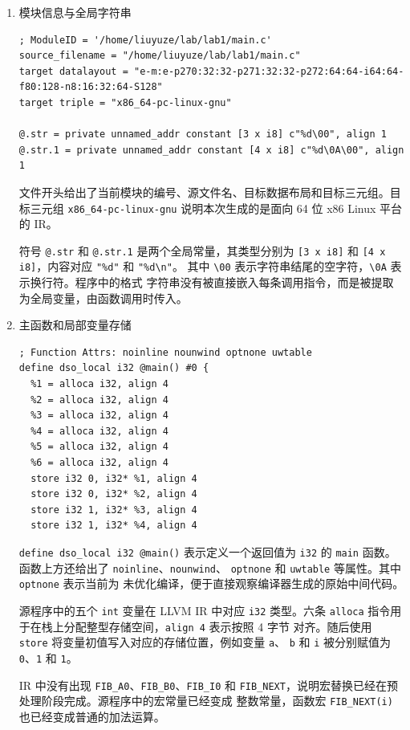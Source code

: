 \documentclass[UTF8,a4paper,10pt]{ctexart}
\begin{document}
\begin{enumerate}[label=\roman*.]
    \item 模块信息与全局字符串

\begin{lstlisting}[style=asm]
; ModuleID = '/home/liuyuze/lab/lab1/main.c'
source_filename = "/home/liuyuze/lab/lab1/main.c"
target datalayout = "e-m:e-p270:32:32-p271:32:32-p272:64:64-i64:64-f80:128-n8:16:32:64-S128"
target triple = "x86_64-pc-linux-gnu"

@.str = private unnamed_addr constant [3 x i8] c"%d\00", align 1
@.str.1 = private unnamed_addr constant [4 x i8] c"%d\0A\00", align 1
\end{lstlisting}

文件开头给出了当前模块的编号、源文件名、目标数据布局和目标三元组。目标三元组
\verb|x86_64-pc-linux-gnu| 说明本次生成的是面向 64 位 x86 Linux 平台的 IR。

符号 \verb|@.str| 和 \verb|@.str.1| 是两个全局常量，其类型分别为
\verb|[3 x i8]| 和 \verb|[4 x i8]|，内容对应 \verb|"%d"| 和 \verb|"%d\n"|。
其中 \verb|\00| 表示字符串结尾的空字符，\verb|\0A| 表示换行符。程序中的格式
字符串没有被直接嵌入每条调用指令，而是被提取为全局变量，由函数调用时传入。

    \item 主函数和局部变量存储

\begin{lstlisting}[style=asm]
; Function Attrs: noinline nounwind optnone uwtable
define dso_local i32 @main() #0 {
  %1 = alloca i32, align 4
  %2 = alloca i32, align 4
  %3 = alloca i32, align 4
  %4 = alloca i32, align 4
  %5 = alloca i32, align 4
  %6 = alloca i32, align 4
  store i32 0, i32* %1, align 4
  store i32 0, i32* %2, align 4
  store i32 1, i32* %3, align 4
  store i32 1, i32* %4, align 4
\end{lstlisting}

\verb|define dso_local i32 @main()| 表示定义一个返回值为 \verb|i32| 的
\verb|main| 函数。函数上方还给出了 \verb|noinline|、\verb|nounwind|、
\verb|optnone| 和 \verb|uwtable| 等属性。其中 \verb|optnone| 表示当前为
未优化编译，便于直接观察编译器生成的原始中间代码。

源程序中的五个 \verb|int| 变量在 LLVM IR 中对应 \verb|i32| 类型。六条
\verb|alloca| 指令用于在栈上分配整型存储空间，\verb|align 4| 表示按照 4 字节
对齐。随后使用 \verb|store| 将变量初值写入对应的存储位置，例如变量 \verb|a|、
\verb|b| 和 \verb|i| 被分别赋值为 \verb|0|、\verb|1| 和 \verb|1|。

IR 中没有出现 \verb|FIB_A0|、\verb|FIB_B0|、\verb|FIB_I0| 和
\verb|FIB_NEXT|，说明宏替换已经在预处理阶段完成。源程序中的宏常量已经变成
整数常量，函数宏 \verb|FIB_NEXT(i)| 也已经变成普通的加法运算。


\end{enumerate}
\end{document}
